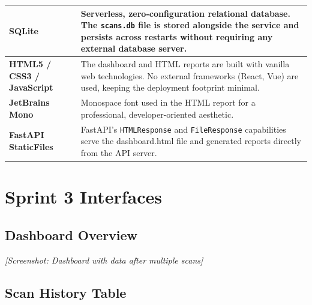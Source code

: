 \vspace{0.5cm}
\begin{tabular}{| m{2.5cm} | m{10cm} |}
\hline

\textbf{SQLite} &
Serverless, zero-configuration relational database. The \texttt{scans.db} file is stored alongside the service and persists across restarts without requiring any external database server.
\\
\hline

\textbf{HTML5 / CSS3 / JavaScript} &
The dashboard and HTML reports are built with vanilla web technologies. No external frameworks (React, Vue) are used, keeping the deployment footprint minimal.
\\
\hline

\textbf{JetBrains Mono} &
Monospace font used in the HTML report for a professional, developer-oriented aesthetic.
\\
\hline

\textbf{FastAPI StaticFiles} &
FastAPI's \texttt{HTMLResponse} and \texttt{FileResponse} capabilities serve the dashboard.html file and generated reports directly from the API server.
\\
\hline

\end{tabular}

\section{Sprint 3 Interfaces}

\subsection{Dashboard Overview}


\textit{[Screenshot: Dashboard with data after multiple scans]}

\subsection{Scan History Table}

